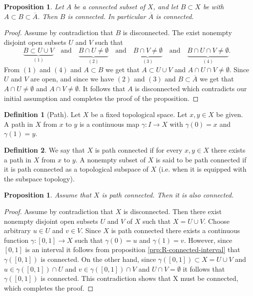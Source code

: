 \documentclass[11pt,a4paper]{article}
\theoremstyle{definition}
\newtheorem{definition}{Definition}[section]
\theoremstyle{plain}
\newtheorem{proposition}[theorem]{Proposition}
\newcommand{\tand}{\quad \text{and} \quad}
\begin{document}
  \begin{proposition}
    Let $A$ be a connected subset of $X$, and let $B \subset X$ be with
    $A \subset B \subset \overline A$.
    Then $B$ is connected.
    In particular $\overline A$ is connected.
  \end{proposition}
  \begin{proof}
    Assume by contradiction that $B$ is disconnected.
    The exist nonempty disjoint open subsets $U$ and $V$ such that
    \[
      \underbrace{B \subset U \cup V}_{(1)} \tand
      \underbrace{B \cap U \neq \emptyset}_{(2)} \tand
      \underbrace{B \cap V \neq \emptyset}_{(3)} \tand
      \underbrace{B \cap U \cap V \neq \emptyset}_{(4)}.
    \]
    From $(1)$ and $(4)$ and $A \subset B$ we get that
    $A \subset U \cup V$ and $A \cap U \cap V \neq \emptyset$.
    Since $U$ and $V$ are open, and since we have $(2)$ and $(3)$ and
    $B \subset \overline A$ we get that $A \cap U \neq \emptyset$ and
    $A \cap V \neq \emptyset$.
    It follows that $A$ is disconnected which contradicts our initial
    assumption and completes the proof of the proposition.
  \end{proof}

  \begin{definition}[Path]
    Let $X$ be a fixed topological space.
    Let $x, y \in X$ be given.
    A path in $X$ from $x$ to $y$ is a continuous map
    $\gamma \colon I \to X$ with $\gamma(0) = x$ and $\gamma(1) = y$.
  \end{definition}
  
  \begin{definition}
    We say that $X$ is path connected if for every $x, y \in X$ there exists
    a path in $X$ from $x$ to $y$.
    A nonempty subset of $X$ is said to be path connected if it is
    path connected as a topological subspace of $X$
    (i.e. when it is equipped with the subspace topology).
  \end{definition}

  \begin{proposition}
    Assume that $X$ is path connected. Then it is also connected.
  \end{proposition}
  \begin{proof}
    Assume by contradiction that $X$ is disconnected.
    Then there exist nonempty disjoint open subsets $U$ and $V$ of $X$
    such that $X = U \cup V$.
    Choose arbitrary $u \in U$ and $v \in V$.
    Since $X$ is path connected there exists a continuous function
    $\gamma \colon [0,1] \to X$ such that $\gamma(0) = u$ and $\gamma(1) = v$.
    However, since $[0,1]$ is an interval it follows from proposition
    \ref{prp:R-connected-interval} that $\gamma([0,1])$ is connected.
    On the other hand, since $\gamma([0,1]) \subset X = U \cup V$
    and $u \in \gamma([0,1]) \cap U$ and $v \in \gamma([0,1]) \cap V$
    and $U \cap V = \emptyset$ it follows that $\gamma([0,1])$ is connected.
    This contradiction shows that X must be connected,
    which completes the proof.
  \end{proof}
\end{document}
